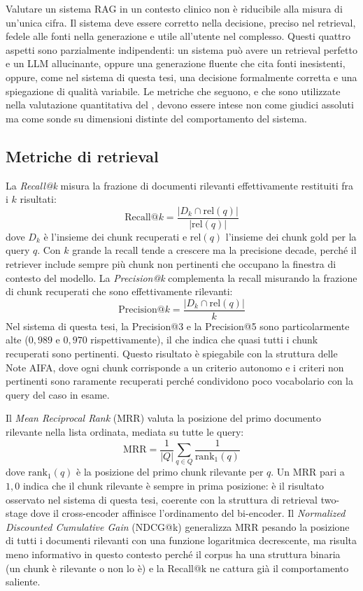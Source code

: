 Valutare un sistema RAG in un contesto clinico non è riducibile alla misura
di un'unica cifra. Il sistema deve essere corretto nella decisione, preciso
nel retrieval, fedele alle fonti nella generazione e utile all'utente nel
complesso. Questi quattro aspetti sono parzialmente indipendenti: un sistema
può avere un retrieval perfetto e un LLM allucinante, oppure una generazione
fluente che cita fonti inesistenti, oppure, come nel sistema di questa tesi,
una decisione formalmente corretta e una spiegazione di qualità variabile.
Le metriche che seguono, e che sono utilizzate nella valutazione quantitativa
del , devono essere intese non come giudici assoluti ma
come sonde su dimensioni distinte del comportamento del sistema.

\subsection{Metriche di retrieval}
\label{subsec:metr-retrieval}

La \emph{Recall@k} misura la frazione di documenti rilevanti effettivamente
restituiti fra i $k$ risultati:
\[
  \text{Recall@}k = \frac{|D_k \cap \text{rel}(q)|}{|\text{rel}(q)|}
\]
dove $D_k$ è l'insieme dei chunk recuperati e $\text{rel}(q)$ l'insieme dei
chunk gold per la query $q$. Con $k$ grande la recall tende a crescere ma la
precisione decade, perché il retriever include sempre più chunk non pertinenti
che occupano la finestra di contesto del modello. La \emph{Precision@k}
complementa la recall misurando la frazione di chunk recuperati che sono
effettivamente rilevanti:
\[
  \text{Precision@}k = \frac{|D_k \cap \text{rel}(q)|}{k}
\]
Nel sistema di questa tesi, la Precision@3 e la Precision@5 sono
particolarmente alte ($0{,}989$ e $0{,}970$ rispettivamente), il che indica
che quasi tutti i chunk recuperati sono pertinenti. Questo risultato è
spiegabile con la struttura delle Note AIFA, dove ogni chunk corrisponde a
un criterio autonomo e i criteri non pertinenti sono raramente recuperati
perché condividono poco vocabolario con la query del caso in esame.

Il \emph{Mean Reciprocal Rank} (MRR) valuta la posizione del primo documento
rilevante nella lista ordinata, mediata su tutte le query:
\[
  \text{MRR} = \frac{1}{|Q|} \sum_{q \in Q} \frac{1}{\text{rank}_1(q)}
\]
dove $\text{rank}_1(q)$ è la posizione del primo chunk rilevante per $q$.
Un MRR pari a $1{,}0$ indica che il chunk rilevante è sempre in prima
posizione: è il risultato osservato nel sistema di questa tesi, coerente
con la struttura di retrieval two-stage dove il cross-encoder affinisce
l'ordinamento del bi-encoder. Il \emph{Normalized Discounted Cumulative Gain}
(NDCG@k) generalizza MRR pesando la posizione di tutti i documenti rilevanti
con una funzione logaritmica decrescente, ma risulta meno informativo in
questo contesto perché il corpus ha una struttura binaria (un chunk è
rilevante o non lo è) e la Recall@k ne cattura già il comportamento saliente.

